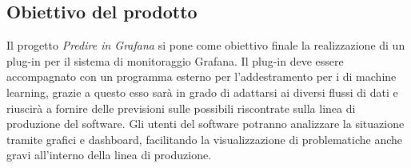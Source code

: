 \documentclass[../analisi-dei-requisiti.tex]{subfiles}
\begin{document}
\subsection{Obiettivo del prodotto}
\label{subs:obiettivo_del_prodotto}
	Il progetto \emph{Predire in Grafana} si pone come obiettivo finale la realizzazione di un plug-in per il sistema di monitoraggio Grafana. Il plug-in deve essere accompagnato con un programma esterno per l'addestramento per i  di machine learning, grazie a questo esso sarà in grado di adattarsi ai diversi flussi di dati e riuscirà a fornire delle previsioni sulle possibili  riscontrate sulla linea di produzione del software. Gli utenti del software potranno analizzare la situazione tramite grafici e dashboard, facilitando la visualizzazione di problematiche anche gravi all'interno della linea di produzione.
\end{document}
